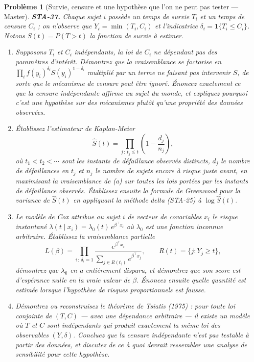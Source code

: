 \documentclass[11pt]{article}
\newtheorem{problem}{Problème}
\begin{document}
\bigskip

\begin{problem}[{Survie, censure et une hypothèse que l'on ne peut pas tester --- Master}]
\textbf{STA-37.} Chaque sujet $ i $ possède un temps de survie $ T_i $ et un temps de censure
$ C_i $ ; on n'observe que $ Y_i = \min(T_i, C_i) $ et l'indicatrice
$ \delta_i = \mathbf{1}\{ T_i \le C_i \} $. Notons $ S(t) = P(T > t) $ la fonction de survie
à estimer.
\begin{enumerate}
\item[(a)] Supposons $ T_i $ et $ C_i $ indépendants, la loi de $ C_i $ ne dépendant pas des
paramètres d'intérêt. Démontrez que la vraisemblance se factorise en
$ \prod_i f(y_i)^{\delta_i} S(y_i)^{1-\delta_i} $ multiplié par un terme ne faisant pas
intervenir $ S $, de sorte que le mécanisme de censure peut être ignoré. Énoncez exactement ce
que la censure indépendante affirme au sujet du monde, et expliquez pourquoi c'est une hypothèse
sur des mécanismes plutôt qu'une propriété des données observées.
\item[(b)] Établissez l'estimateur de Kaplan-Meier
\[ \hat{S}(t) = \prod_{j \,:\, t_j \le t} \left( 1 - \frac{d_j}{n_j} \right) , \]
où $ t_1 < t_2 < \cdots $ sont les instants de défaillance observés distincts, $ d_j $ le
nombre de défaillances en $ t_j $ et $ n_j $ le nombre de sujets encore à risque juste avant,
en maximisant la vraisemblance de (a) sur toutes les lois portées par les instants de défaillance
observés. Établissez ensuite la formule de Greenwood pour la variance de $ \hat{S}(t) $ en
appliquant la méthode delta (STA-25) à $ \log \hat{S}(t) $.
\item[(c)] Le modèle de Cox attribue au sujet $ i $ de vecteur de covariables $ x_i $ le risque
instantané $ \lambda(t \mid x_i) = \lambda_0(t)\, e^{\beta^{\top} x_i} $ où $ \lambda_0 $ est
une fonction inconnue arbitraire. Établissez la vraisemblance partielle
\[ L(\beta) = \prod_{i \,:\, \delta_i = 1}
 \frac{ e^{\beta^{\top} x_i} }{ \sum_{j \in R(t_i)} e^{\beta^{\top} x_j} } , \qquad
 R(t) = \{ j : Y_j \ge t \} , \]
démontrez que $ \lambda_0 $ en a entièrement disparu, et démontrez que son score est d'espérance
nulle en la vraie valeur de $ \beta $. Énoncez ensuite quelle quantité est estimée lorsque
l'hypothèse de risques proportionnels est fausse.
\item[(d)] Démontrez ou reconstruisez le théorème de Tsiatis (1975) : pour toute loi conjointe de
$ (T, C) $ --- avec une dépendance arbitraire --- il existe un modèle où $ T $ et $ C $ sont
\textit{indépendants} qui produit exactement la même loi des observables $ (Y, \delta) $. Concluez
que la censure indépendante n'est pas testable à partir des données, et discutez de ce à quoi
devrait ressembler une analyse de sensibilité pour cette hypothèse.
\end{enumerate}

\end{problem}
\end{document}

